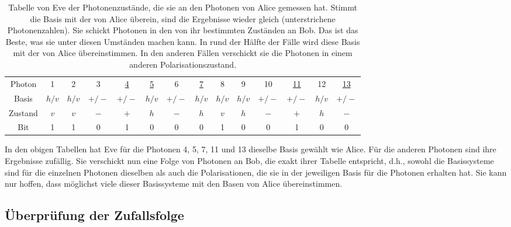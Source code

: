 \begin{table}[htb]
\begin{tabular}{c|c|c|c|c|c|c|c|c|c|c|c|c|c}
Photon & 1 & 2 & 3 & \underline{4} & \underline{5} & 6 & \underline{7} & 8 & 9 & 10 & 
                        \underline{11} & 12 & \underline{13}  \\
Basis & $h/v$ & $h/v$ & $+/-$ & $+/-$ & $h/v$ & $+/-$ & $h/v$ &$h/v$ &$h/v$ & $+/-$ & $+/-$ & $h/v$ & $+/-$ \\
Zustand & $v$ & $v$ & $-$ & $+$ & $h$ & $-$ & $h$ &$v$ &$h$ & $-$ & $+$ & $h$ & $-$ \\
Bit & 1 & 1 & 0 & 1 & 0 & 0 & 0 & 1 & 0 & 0 & 1 & 0 & 0       
\end{tabular}
\caption{\label{tab_Eve1}%
Tabelle von Eve der Photonenzust\"ande, die sie an den Photonen von Alice gemessen hat. Stimmt die Basis
mit der von Alice \"uberein, sind die Ergebnisse wieder gleich (unterstrichene Photonenzahlen). 
Sie schickt Photonen in den von ihr bestimmten Zust\"anden an Bob. Das ist das Beste, was sie unter diesen 
Umst\"anden machen kann. In rund der H\"alfte der F\"alle wird diese Basis mit der von Alice \"ubereinstimmen. In
den anderen F\"allen verschickt sie die Photonen in einem anderen Polarisationszustand.}         
\end{table}

In den obigen Tabellen hat Eve f\"ur die Photonen 4, 5, 7, 11 und 13 dieselbe Basis gew\"ahlt wie Alice. 
F\"ur die anderen Photonen sind ihre Ergebnisse zuf\"allig. Sie verschickt nun eine Folge von Photonen
an Bob, die exakt ihrer Tabelle entspricht, d.h., sowohl die Basissysteme sind f\"ur die einzelnen Photonen
dieselben als auch die Polarisationen, die sie in der jeweiligen Basis f\"ur die Photonen erhalten hat. 
Sie kann nur hoffen, dass m\"oglichst viele dieser Basissysteme mit den Basen von Alice \"ubereinstimmen. 

\subsection{\"Uberpr\"ufung der Zufallsfolge}
\label{sec_Test}

